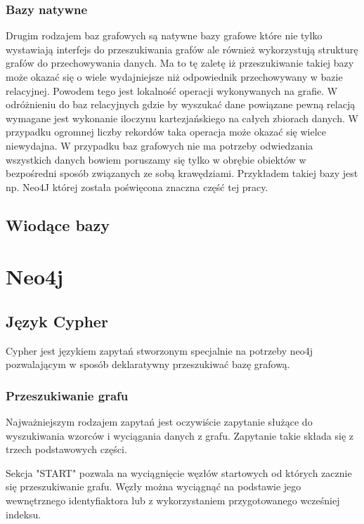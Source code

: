 \documentclass[brudnopis]{xmgr}
\begin{document}
\subsection{Bazy natywne}
Drugim rodzajem baz grafowych są natywne bazy grafowe które nie tylko wystawiają interfejs do przeszukiwania grafów ale również wykorzystują strukturę grafów do przechowywania danych. Ma to tę zaletę iż przeszukiwanie takiej bazy może okazać się o wiele wydajniejsze niż odpowiednik przechowywany w bazie relacyjnej. Powodem tego jest lokalność operacji wykonywanych na grafie. W odróżnieniu do baz relacyjnych gdzie by wyszukać dane powiązane pewną relacją wymagane jest wykonanie iloczynu kartezjańskiego na całych zbiorach danych. W przypadku ogromnej liczby rekordów taka operacja może okazać się wielce niewydajna. W przypadku baz grafowych nie ma potrzeby odwiedzania wszystkich danych bowiem poruszamy się tylko w obrębie obiektów w bezpośredni sposób związanych ze sobą krawędziami. Przykładem takiej bazy jest np. Neo4J której została poświęcona znaczna część tej pracy.

\section{Wiodące bazy}

\chapter{Neo4j}

\section{Język Cypher}
Cypher jest językiem zapytań stworzonym specjalnie na potrzeby neo4j pozwalającym w sposób deklaratywny przeszukiwać bazę grafową.

\subsection{Przeszukiwanie grafu}

Najważniejszym rodzajem zapytań jest oczywiście zapytanie służące do wyszukiwania wzorców i wyciągania danych z grafu. Zapytanie takie składa się z trzech podstawowych części.

Sekcja "START" pozwala na wyciągnięcie węzłów startowych od których zacznie się przeszukiwanie grafu. Węzły można wyciągnąć na podstawie jego wewnętrznego identyfiaktora lub z wykorzystaniem przygotowanego wcześniej indeksu.
\end{document}
